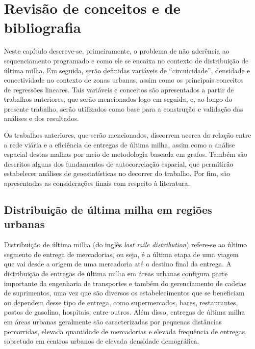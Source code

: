\chapter{Revisão de conceitos e de bibliografia} \label{sec:revis_biblio}

Neste capítulo descreve-se, primeiramente, o problema de não aderência ao sequenciamento programado e como ele se encaixa no contexto de distribuição de última milha.
Em seguida, serão definidas variáveis de ``circuicidade'', densidade e conectividade no contexto de zonas urbanas, assim como os principais conceitos de regressões lineares.
Tais variáveis e conceitos são apresentados a partir de trabalhos anteriores, que serão mencionados logo em seguida, e, ao longo do presente trabalho, serão utilizados como base para a construção e validação das análises e dos resultados.

Os trabalhos anteriores, que serão mencionados, discorrem acerca da relação entre a rede viária e a eficiência de entregas de última milha, assim como a análise espacial destas malhas por meio de metodologia baseada em grafos. 
Também são descritos alguns dos fundamentos de autocorrelação espacial, que permitirão estabelecer análises de geoestatísticas no decorrer do trabalho. 
Por fim, são apresentadas as considerações finais com respeito à literatura. 

\section{Distribuição de última milha em regiões urbanas} \label{sec:definicaoProblema} 

Distribuição de última milha (do inglês \textit{last mile distribution}) refere-se ao último segmento de entrega de mercadorias, ou seja, é a última etapa de uma viagem que vai desde a origem de uma mercadoria até o destino final da entrega.
A distribuição de entregas de última milha em áreas urbanas configura parte importante da engenharia de transportes e também do gerenciamento de cadeias de suprimentos, uma vez que são diversos os estabelecimentos que se beneficiam ou dependem desse tipo de entrega, como supermercados, bares, restaurantes, postos de gasolina, hospitais, entre outros.
Além disso, entregas de última milha em áreas urbanas geralmente são caracterizadas por pequenas distâncias percorridas, elevada quantidade de mercadorias e elevada frequência de entregas, sobretudo em centros urbanos de elevada densidade demográfica.

